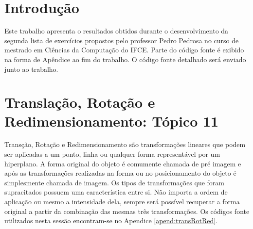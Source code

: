 \documentclass[
	article,			%
	11pt,				%
	oneside,			%
	a4paper,			%
	english,			%
	brazil,				%
	sumario=tradicional
	]{abntex2}
\begin{document}



%
%
\maketitle
\frenchspacing 



\textual

\section*{Introdução}
Este trabalho apresenta o resultados obtidos durante o desenvolvimento da
segunda lista de exercícios propostos pelo professor Pedro Pedrosa no curso de
mestrado em Ciências da Computação do IFCE. Parte do código fonte é exibido na
forma de Apêndice ao fim do trabalho. O código fonte detalhado será enviado
junto ao trabalho. 

\section{Translação, Rotação e Redimensionamento: Tópico 11}
Transção, Rotação e Redimensionamento são transformações lineares que podem ser
aplicadas a um ponto, linha ou qualquer forma representável por um hiperplano.
A forma original do objeto é comumente chamada de pré imagem e após as
transformações realizadas na forma ou no posicionamento do objeto é simplesmente
chamada de imagem.
Os tipos de transformações que foram supracitados possuem uma característica
entre si. Não importa a ordem de aplicação ou mesmo a intensidade dela, sempre
será possível recuperar a forma original a partir da combinação das mesmas três
transformações. Os códigos fonte utilizados nesta sessão encontram-se no
Apendice \ref{apend:transRotRed}.
 
\end{document}
